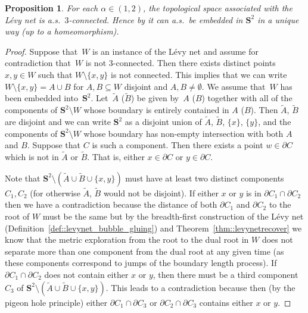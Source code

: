 \documentclass[10pt]{amsart}
\theoremstyle{plain}
\numberwithin{theorem}{section}
\newtheorem{proposition}[theorem]{Proposition}
\theoremstyle{definition}
\renewcommand{\S}{{\mathbf S}}
\let\wt\widetilde
\begin{document}
\begin{proposition}
\label{prop::levynet_three_connected}
For each $\alpha \in (1,2)$, the topological space associated with the Lévy net is a.s.\ $3$-connected. Hence by \cite{3connectedembeduniquely} it can a.s.\ be embedded in $\S^2$ in a unique way (up to a homeomorphism).
\end{proposition}
\begin{proof}
Suppose that~$W$ is an instance of the Lévy net and assume for contradiction that~$W$ is not $3$-connected. Then there exists distinct points $x,y \in W$ such that $W \setminus \{x,y\}$ is not connected. This implies that we can write $W \setminus \{x,y\} = A \cup B$ for $A,B \subseteq W$ disjoint and $A,B \neq \emptyset$. We assume that~$W$ has been embedded into~$\S^2$. Let~$\wt{A}$ (\resp $\wt{B}$) be given by~$A$ (\resp $B$) together with all of the components of $\S^2 \setminus W$ whose boundary is entirely contained in $A$ (\resp $B$). Then $\wt{A}$, $\wt{B}$ are disjoint and we can write $\S^2$ as a disjoint union of $\wt{A}$, $\wt{B}$, $\{x\}$, $\{y\}$, and the components of $\S^2 \setminus W$ whose boundary has non-empty intersection with both $A$ and $B$. Suppose that $C$ is such a component. Then there exists a point $w \in \partial C$ which is not in $\wt{A}$ or $\wt{B}$. That is, either $x \in \partial C$ or $y \in \partial C$.\enlargethispage{.5\baselineskip}%

Note that $\S^2 \setminus (\wt{A} \cup \wt{B} \cup \{x,y\})$ must have at least two distinct components $C_1,C_2$ (for otherwise $\wt{A}$, $\wt{B}$ would not be disjoint). If either $x$ or $y$ is in $\partial C_1 \cap \partial C_2$ then we have a contradiction because the distance of both $\partial C_1$ and $\partial C_2$ to the root of $W$ must be the same but by the breadth-first construction of the Lévy net (Definition~\ref{def::levynet_bubble_gluing}) and Theorem~\ref{thm::levynetrecover} we know that the metric exploration from the root to the dual root in $W$ does not separate more than one component from the dual root at any given time (as these components correspond to jumps of the boundary length process). If~$\partial C_1 \cap \partial C_2$ does not contain either $x$ or $y$, then there must be a third component $C_3$ of $\S^2 \setminus (\wt{A} \cup \wt{B} \cup \{x,y\})$. This leads to a contradiction because then (by the pigeon hole principle) either $\partial C_1 \cap \partial C_3$ or $\partial C_2 \cap \partial C_3$ contains either $x$ or $y$.
\end{proof}
\end{document}
